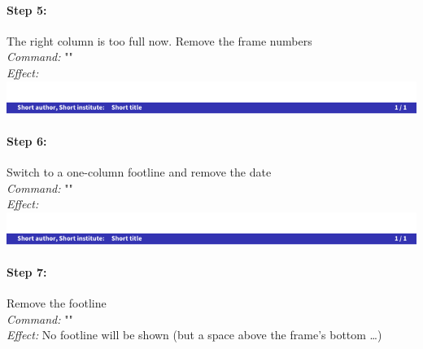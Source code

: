 \documentclass[11pt]{ltxdoc}
\begin{document}
	\paragraph{Step 5:} The right column is too full now. Remove the frame numbers \\
	\textit{Command:} "" \\
	\textit{Effect:} \\
	\includegraphics[page=9, width=\textwidth, trim=0 0 0 15, clip]{hackthefootline-examples}
	
	\paragraph{Step 6:} Switch to a one-column footline and remove the date \\
	\textit{Command:} "" \\
	\textit{Effect:} \\
	\includegraphics[page=10, width=\textwidth, trim=0 0 0 15, clip]{hackthefootline-examples}
	
	\paragraph{Step 7:} Remove the footline \\
	\textit{Command:} "" \\
	\textit{Effect:} No footline will be shown (but a space above the frame's bottom …)
\end{document}
